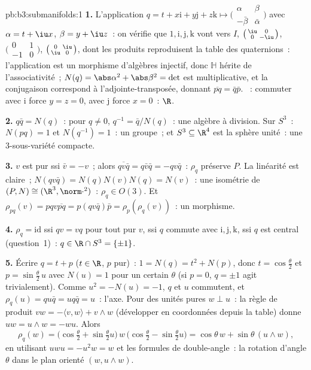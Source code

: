 \begin{solution}{pb:b3:submanifolds:1}
\textbf{1.} L'application $q = t + x\mathrm i + y\mathrm j +
z\mathrm k \mapsto \bigl(\begin{smallmatrix}\alpha & \beta\\
-\bar\beta & \bar\alpha\end{smallmatrix}\bigr)$ avec $\alpha
= t + \iu x$, $\beta = y + \iu z$~: on vérifie que $1,
\mathrm i, \mathrm j, \mathrm k$ vont vers $I$,
$\bigl(\begin{smallmatrix}\iu & 0\\ 0 &
-\iu\end{smallmatrix}\bigr)$,
$\bigl(\begin{smallmatrix}0 & 1\\ -1 &
0\end{smallmatrix}\bigr)$, $\bigl(\begin{smallmatrix}0 &
\iu\\ \iu & 0\end{smallmatrix}\bigr)$, dont les produits
reproduisent la table des quaternions~: l'application est un
morphisme d'algèbres injectif, donc $\mathbb H$ hérite de
l'associativité~; $N(q) = \abs\alpha^2 + \abs\beta^2 =
\det$ est multiplicative, et la conjugaison correspond à
l'adjointe-transposée, donnant $\overline{pq} = \bar q\bar
p$. ~: commuter avec $\mathrm i$ force $y = z = 0$,
avec $\mathrm j$ force $x = 0$~: $\R$.

\textbf{2.} $q\bar q = N(q)$~: pour $q \neq 0$, $q^{-1} =
\bar q/N(q)$~: une algèbre à division. Sur $S^3$~: $N(pq) =
1$ et $N(q^{-1}) = 1$~: un groupe~; et $S^3 \subseteq \R^4$
est la sphère unité~: une $3$-sous-variété compacte.

\textbf{3.} $v$ est pur ssi $\bar v = -v$~; alors
$\overline{qv\bar q} = q\bar v\bar q = -qv\bar q$~:
$\rho_q$ préserve $P$. La linéarité est claire~; $N(qv\bar
q) = N(q)N(v)N(q) = N(v)$~: une isométrie de $(P, N) \cong
(\R^3, \norm\cdot^2)$~: $\rho_q \in O(3)$. Et $\rho_{pq}(v)
= pqv\overline{pq} = p(qv\bar q)\bar p =
\rho_p(\rho_q(v))$~: un morphisme.

\textbf{4.} $\rho_q = \mathrm{id}$ ssi $qv = vq$ pour tout
pur $v$, ssi $q$ commute avec $\mathrm i, \mathrm j,
\mathrm k$, ssi $q$ est central (question~1)~: $q \in
\R\cap S^3 = \{\pm1\}$.

\textbf{5.} Écrire $q = t + p$ ($t \in \R$, $p$ pur)~: $1 =
N(q) = t^2 + N(p)$, donc $t = \cos\frac\theta2$ et $p =
\sin\frac\theta2\,u$ avec $N(u) = 1$ pour un certain
$\theta$ (si $p = 0$, $q = \pm1$ agit trivialement). Comme
$u^2 = -N(u) = -1$, $q$ et $u$ commutent, et $\rho_q(u) =
qu\bar q = uq\bar q = u$~: l'axe. Pour des unités pures $w
\perp u$~: la règle de produit $vw = -\langle v, w\rangle +
v\wedge w$ (développer en coordonnées depuis la table)
donne $uw = u\wedge w = -wu$. Alors
\[
\rho_q(w) = \bigl(\cos\tfrac\theta2 +
\sin\tfrac\theta2u\bigr)\,w\,\bigl(\cos\tfrac\theta2 -
\sin\tfrac\theta2u\bigr)
= \cos\theta\,w + \sin\theta\,(u\wedge w),
\]
en utilisant $uwu = -u^2w = w$ et les formules de
double-angle~: la rotation d'angle $\theta$ dans le plan
orienté $(w, u\wedge w)$.


\end{solution}
